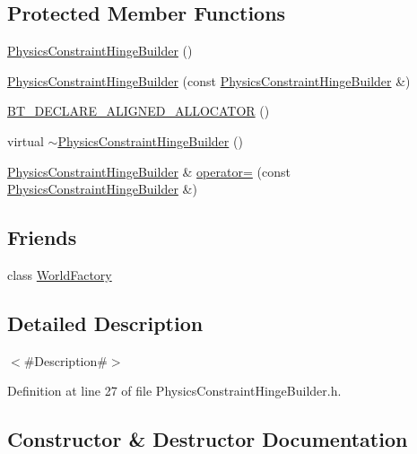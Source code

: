 \subsection*{Protected Member Functions}
\begin{DoxyCompactItemize}
\item 
\mbox{\hyperlink{classnjli_1_1_physics_constraint_hinge_builder_a97d48d59e59a383e0a0bf0c50f01851b}{Physics\+Constraint\+Hinge\+Builder}} ()
\item 
\mbox{\hyperlink{classnjli_1_1_physics_constraint_hinge_builder_ad35c2cdc791f1704662d5feeeb4edd4e}{Physics\+Constraint\+Hinge\+Builder}} (const \mbox{\hyperlink{classnjli_1_1_physics_constraint_hinge_builder}{Physics\+Constraint\+Hinge\+Builder}} \&)
\item 
\mbox{\hyperlink{classnjli_1_1_physics_constraint_hinge_builder_a53d617c2c8f9e304d9590d9f69375653}{B\+T\+\_\+\+D\+E\+C\+L\+A\+R\+E\+\_\+\+A\+L\+I\+G\+N\+E\+D\+\_\+\+A\+L\+L\+O\+C\+A\+T\+OR}} ()
\item 
virtual \mbox{\hyperlink{classnjli_1_1_physics_constraint_hinge_builder_a325190a956d402b524dae04ec343a76e}{$\sim$\+Physics\+Constraint\+Hinge\+Builder}} ()
\item 
\mbox{\hyperlink{classnjli_1_1_physics_constraint_hinge_builder}{Physics\+Constraint\+Hinge\+Builder}} \& \mbox{\hyperlink{classnjli_1_1_physics_constraint_hinge_builder_a9ceff764c6378af8a9a6284c35a0c507}{operator=}} (const \mbox{\hyperlink{classnjli_1_1_physics_constraint_hinge_builder}{Physics\+Constraint\+Hinge\+Builder}} \&)
\end{DoxyCompactItemize}
\subsection*{Friends}
\begin{DoxyCompactItemize}
\item 
class \mbox{\hyperlink{classnjli_1_1_physics_constraint_hinge_builder_acb96ebb09abe8f2a37a915a842babfac}{World\+Factory}}
\end{DoxyCompactItemize}


\subsection{Detailed Description}
$<$\#\+Description\#$>$ 

Definition at line 27 of file Physics\+Constraint\+Hinge\+Builder.\+h.



\subsection{Constructor \& Destructor Documentation}
\mbox{\label{classnjli_1_1_physics_constraint_hinge_builder_a97d48d59e59a383e0a0bf0c50f01851b}} 
